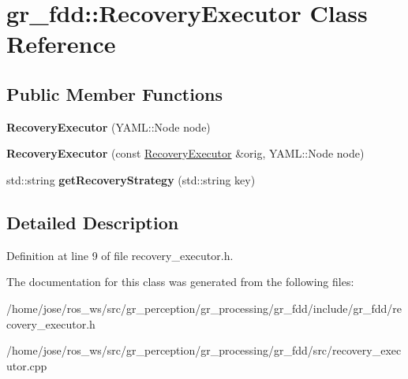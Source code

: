 \hypertarget{classgr__fdd_1_1RecoveryExecutor}{}\section{gr\+\_\+fdd\+:\+:Recovery\+Executor Class Reference}
\label{classgr__fdd_1_1RecoveryExecutor}
\subsection*{Public Member Functions}
\begin{DoxyCompactItemize}
\item 
\mbox{\label{classgr__fdd_1_1RecoveryExecutor_ac5a19ed1c2eac43451f3d12207d0e5c9}} 
{\bfseries Recovery\+Executor} (Y\+A\+M\+L\+::\+Node node)
\item 
\mbox{\label{classgr__fdd_1_1RecoveryExecutor_a6e556952d65bc5cc4189df707f90555f}} 
{\bfseries Recovery\+Executor} (const \hyperlink{classgr__fdd_1_1RecoveryExecutor}{Recovery\+Executor} \&orig, Y\+A\+M\+L\+::\+Node node)
\item 
\mbox{\label{classgr__fdd_1_1RecoveryExecutor_a6dfeb9e21594cd1eec16a9d17c0040d8}} 
std\+::string {\bfseries get\+Recovery\+Strategy} (std\+::string key)
\end{DoxyCompactItemize}


\subsection{Detailed Description}


Definition at line 9 of file recovery\+\_\+executor.\+h.



The documentation for this class was generated from the following files\+:\begin{DoxyCompactItemize}
\item 
/home/jose/ros\+\_\+ws/src/gr\+\_\+perception/gr\+\_\+processing/gr\+\_\+fdd/include/gr\+\_\+fdd/recovery\+\_\+executor.\+h\item 
/home/jose/ros\+\_\+ws/src/gr\+\_\+perception/gr\+\_\+processing/gr\+\_\+fdd/src/recovery\+\_\+executor.\+cpp\end{DoxyCompactItemize}
